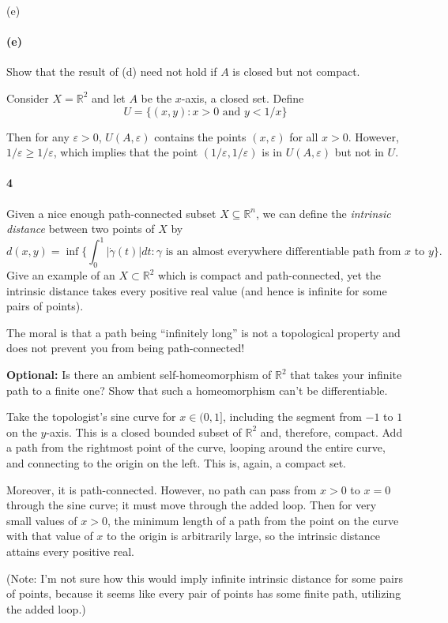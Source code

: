 \documentclass[12pt]{article}
\newlength{\myparskip}
\newenvironment{fullbox}{\begin{lrbox}{\savefullbox}\begin{minipage}{\dimexpr\textwidth-2\fboxsep\relax}\setlength{\parskip}{\myparskip}}{\end{minipage}\end{lrbox}\framebox[\textwidth]{\usebox{\savefullbox}}}
\newenvironment{pbox}[1][]{\begin{fullbox}\ifx#1\empty\else\paragraph{#1}\fi}{\end{fullbox}}
\newcommand{\R}{\mathbb{R}}
\newcommand{\eps}{\varepsilon}
\newcommand{\<}{\langle}
\renewcommand{\>}{\rangle}
\begin{document}
\begin{pbox}[(e)]
    Show that the result of (d) need not hold if $A$ is closed but not
        compact.
\end{pbox}

Consider $X = \R^2$ and let $A$ be the $x$-axis, a closed set. Define
\[
    U = \{(x, y) : x > 0 \text{ and } y < 1/x\}
\]

Then for any $\eps > 0$, $U(A, \eps)$ contains the points $(x, \eps)$ for all $x > 0$. However, $1/\eps \geq 1/\eps$, which implies that the point $(1/\eps, 1/\eps)$ is in $U(A, \eps)$ but not in $U$.

\newpage
\begin{pbox}[4]
    Given a nice enough path-connected subset $X \subseteq \mathbb R^n$, we
      can define the \emph{intrinsic distance} between two points of $X$ by
      \[d(x,y)=\inf \bigl\{{\textstyle\int_0^1} \lvert\dot\gamma(t)\rvert dt : \gamma\text{ is an almost everywhere differentiable path from $x$ to }y\bigr\}.\]
      Give an example of an $X \subset \mathbb R^2$ which is compact and
      path-connected, yet the intrinsic distance takes every positive real value
      (and hence is infinite for some pairs of points).
    
      The moral is that a path being ``infinitely long'' is not a topological
      property and does not prevent you from being path-connected!
    
      \textbf{Optional:} Is there an ambient self-homeomorphism of $\mathbb R^2$ that takes your infinite path to a finite one?  Show that such a homeomorphism can't be differentiable.
\end{pbox}

Take the topologist's sine curve for $x \in (0, 1]$, including the segment from $-1$ to $1$ on the $y$-axis. This is a closed bounded subset of $\R^2$ and, therefore, compact. Add a path from the rightmost point of the curve, looping around the entire curve, and connecting to the origin on the left. This is, again, a compact set.

Moreover, it is path-connected. However, no path can pass from $x > 0$ to $x = 0$ through the sine curve; it must move through the added loop. Then for very small values of $x > 0$, the minimum length of a path from the point on the curve with that value of $x$ to the origin is arbitrarily large, so the intrinsic distance attains every positive real.

(Note: I'm not sure how this would imply infinite intrinsic distance for some pairs of points, because it seems like every pair of points has some finite path, utilizing the added loop.)
\end{document}
